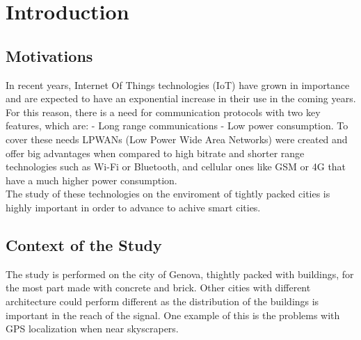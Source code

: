 
\chapter*{Introduction}
\label{chap:introduction}
\ifpdf
    \graphicspath{{Introduction/Figures/PNG/}{Introduction/Figures/PDF/}{Introduction/Figures/}}
\else
    \graphicspath{{Introduction/Figures/EPS/}{Introduction/Figures/}}
\fi




\section{Motivations}
\label{motivations}
In recent years, Internet Of Things technologies (IoT) have grown in
importance and are expected to have an exponential increase in their
use in the coming years. For this reason, there is a need for
communication protocols with two key features, which are:
- Long range communications
- Low power consumption.
To cover these needs LPWANs (Low Power Wide Area Networks) were
created and offer big advantages when compared to high bitrate and
shorter range technologies such as Wi-Fi or Bluetooth, and cellular ones
like GSM or 4G that have a much higher power consumption.\\
The study of these technologies on the enviroment of tightly packed 
cities is highly important in order to advance to achive smart cities.
  
\section{Context of the Study}
\label{context}
The study is performed on the city of Genova, thightly packed with 
buildings, for the most part made with concrete and brick. Other 
cities with different architecture could perform different as the 
distribution of the buildings is important in the reach of the 
signal. One example of this is the problems with GPS localization 
when near skyscrapers.

